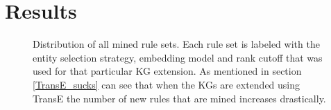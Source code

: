 \chapter{Results}
\begin{figure}[htbp]
\centering
    \centering
    
    \caption[Dist. of all sets of mined rules.]{Distribution of all mined rule sets. Each rule set is labeled with the entity selection strategy, embedding model and rank cutoff that was used for that particular KG extension. As mentioned in section \ref{TransE_sucks} can see that when the KGs are extended using TransE the number of new rules that are mined increases drastically.}
    \label{all_sets}
\end{figure}


